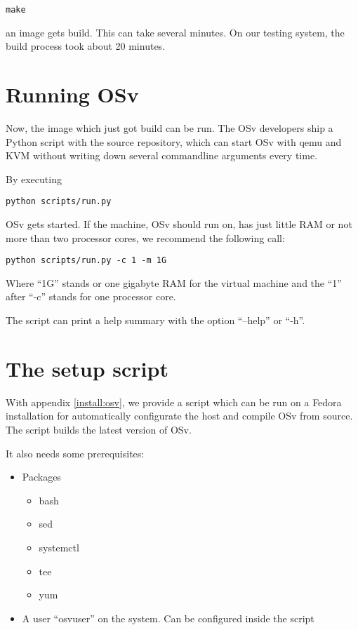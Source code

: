\begin{lstlisting}
make
\end{lstlisting}

    an image gets build. This can take several minutes. On our testing
    system, the build process took about 20 minutes.

\chapter{Running OSv}

    Now, the image which just got build can be run. The OSv developers ship a
    Python script with the source repository, which can start OSv with qemu and
    KVM without writing down several commandline arguments every time.

    By executing

\begin{lstlisting}
python scripts/run.py
\end{lstlisting}

    OSv gets started. If the machine, OSv should run on, has just little RAM or
    not more than two processor cores, we recommend the following call:

\begin{lstlisting}
python scripts/run.py -c 1 -m 1G
\end{lstlisting}

    Where ``1G'' stands or one gigabyte RAM for the virtual machine and the
    ``1'' after  ``-c'' stands for one processor core.

    The script can print a help summary with the option ``--help'' or ``-h''.

\chapter{The setup script}

    With appendix \ref{install:osv}, we provide a script which can be run on a
    Fedora installation for automatically configurate the host and compile OSv
    from source. The script builds the latest version of OSv.

    It also needs some prerequisites:

        \begin{itemize}
            \item Packages
            \begin{itemize}
                \item bash
                \item sed
                \item systemctl
                \item tee
                \item yum
            \end{itemize}

            \item A user ``osvuser'' on the system. Can be configured inside the
            script
        \end{itemize}

